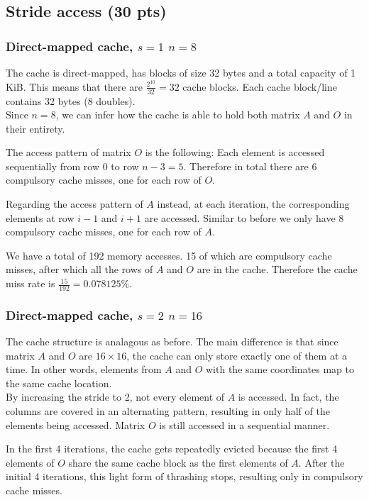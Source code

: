\renewcommand{\thesubsubsection}{\alph{subsubsection})}
\setcounter{section}{4}
\setcounter{subsection}{0}
\renewcommand{\thesubsubsection}{\alph{subsubsection})}

\subsection{Stride access (30 pts)}
\subsubsection{Direct-mapped cache, $s=1$ $n=8$}
The cache is direct-mapped, has blocks of size 32 bytes and a total capacity of 1 KiB. This means that there are $\frac{2^{10}}{32} = 32$ cache blocks. Each cache block/line contains 32 bytes (8 doubles).\\

Since $n=8$, we can infer how the cache is able to hold both matrix $A$ and $O$ in their entirety.

The access pattern of matrix $O$ is the following: Each element is accessed sequentially from row $0$ to row $n-3=5$. Therefore in total there are 6 compulsory cache misses, one for each row of $O$.

Regarding the access pattern of $A$ instead, at each iteration, the corresponding elements at row $i-1$ and $i+1$ are accessed. Similar to before we only have 8 compulsory cache misses, one for each row of $A$.

We have a total of 192 memory accesses. 15 of which are compulsory cache misses, after which all the rows of $A$ and $O$ are in the cache. Therefore the cache miss rate is $\frac{15}{192}  = 0.078125\%$.\vspace*{-0.4cm}
\subsubsection{Direct-mapped cache, $s=2$ $n=16$}
The cache structure is analagous as before. The main difference is that since matrix $A$ and $O$ are $16\times16$, the cache can only store exactly one of them at a time. In other words, elements from $A$ and $O$ with the same coordinates map to the same cache location.\\
By increasing the stride to 2, not every element of $A$ is accessed. In fact, the columns are covered in an alternating pattern, resulting in only half of the elements  being accessed. Matrix $O$ is still accessed in a sequential manner.

In the first 4 iterations, the cache gets repeatedly evicted because the first 4 elements of $O$ share the same cache block as the first elements of $A$. After the initial 4 iterations, this light form of thrashing stops, resulting only in compulsory cache misses.

